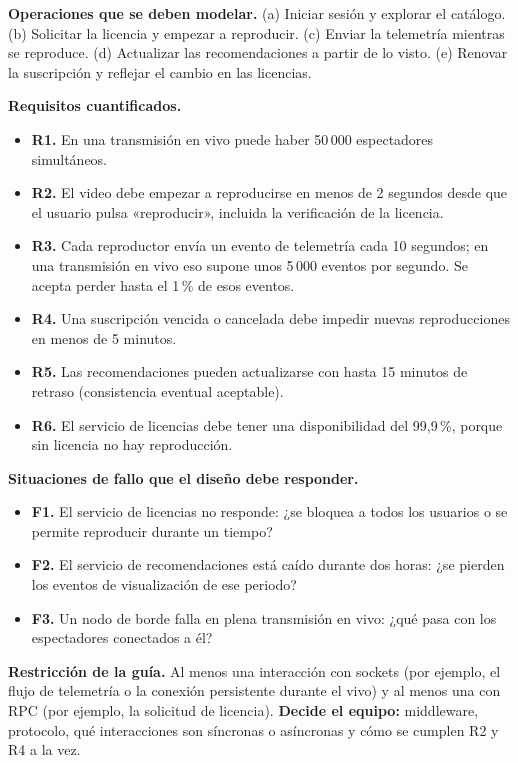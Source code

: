 \documentclass[10pt]{article}
\begin{document}
\textbf{Operaciones que se deben modelar.} (a) Iniciar sesión y explorar el catálogo. (b) Solicitar la licencia y empezar a reproducir. (c) Enviar la telemetría mientras se reproduce. (d) Actualizar las recomendaciones a partir de lo visto. (e) Renovar la suscripción y reflejar el cambio en las licencias.

\textbf{Requisitos cuantificados.}
\begin{itemize}[leftmargin=1.6em]
	\item \textbf{R1.} En una transmisión en vivo puede haber 50\,000 espectadores simultáneos.
	\item \textbf{R2.} El video debe empezar a reproducirse en menos de 2 segundos desde que el usuario pulsa «reproducir», incluida la verificación de la licencia.
	\item \textbf{R3.} Cada reproductor envía un evento de telemetría cada 10 segundos; en una transmisión en vivo eso supone unos 5\,000 eventos por segundo. Se acepta perder hasta el 1\,\% de esos eventos.
	\item \textbf{R4.} Una suscripción vencida o cancelada debe impedir nuevas reproducciones en menos de 5 minutos.
	\item \textbf{R5.} Las recomendaciones pueden actualizarse con hasta 15 minutos de retraso (consistencia eventual aceptable).
	\item \textbf{R6.} El servicio de licencias debe tener una disponibilidad del 99,9\,\%, porque sin licencia no hay reproducción.
\end{itemize}

\textbf{Situaciones de fallo que el diseño debe responder.}
\begin{itemize}[leftmargin=1.6em]
	\item \textbf{F1.} El servicio de licencias no responde: ¿se bloquea a todos los usuarios o se permite reproducir durante un tiempo?
	\item \textbf{F2.} El servicio de recomendaciones está caído durante dos horas: ¿se pierden los eventos de visualización de ese periodo?
	\item \textbf{F3.} Un nodo de borde falla en plena transmisión en vivo: ¿qué pasa con los espectadores conectados a él?
\end{itemize}

\textbf{Restricción de la guía.} Al menos una interacción con sockets (por ejemplo, el flujo de telemetría o la conexión persistente durante el vivo) y al menos una con RPC (por ejemplo, la solicitud de licencia). \textbf{Decide el equipo:} middleware, protocolo, qué interacciones son síncronas o asíncronas y cómo se cumplen R2 y R4 a la vez.
\end{document}
